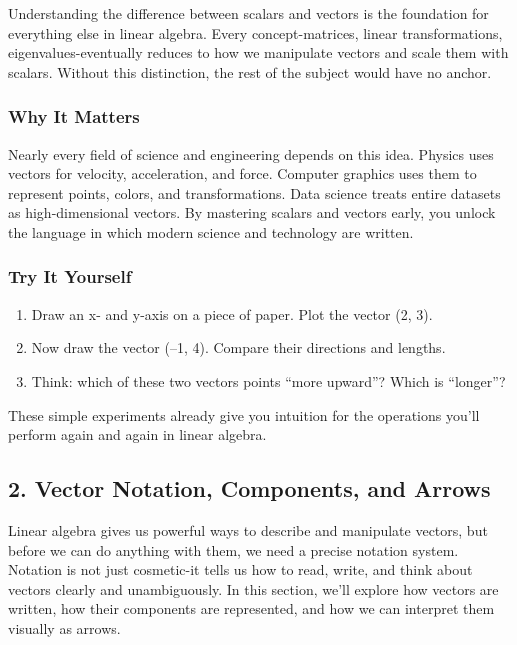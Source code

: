 \documentclass[
  letterpaper,
  DIV=11,
  numbers=noendperiod]{scrreprt}
\providecommand{\tightlist}{%
  \setlength{\itemsep}{0pt}\setlength{\parskip}{0pt}}
\begin{document}
Understanding the difference between scalars and vectors is the
foundation for everything else in linear algebra. Every
concept-matrices, linear transformations, eigenvalues-eventually reduces
to how we manipulate vectors and scale them with scalars. Without this
distinction, the rest of the subject would have no anchor.

\subsubsection{Why It Matters}\label{why-it-matters}

Nearly every field of science and engineering depends on this idea.
Physics uses vectors for velocity, acceleration, and force. Computer
graphics uses them to represent points, colors, and transformations.
Data science treats entire datasets as high-dimensional vectors. By
mastering scalars and vectors early, you unlock the language in which
modern science and technology are written.

\subsubsection{Try It Yourself}\label{try-it-yourself}

\begin{enumerate}
\def\labelenumi{\arabic{enumi}.}
\tightlist
\item
  Draw an x- and y-axis on a piece of paper. Plot the vector (2, 3).
\item
  Now draw the vector (--1, 4). Compare their directions and lengths.
\item
  Think: which of these two vectors points ``more upward''? Which is
  ``longer''?
\end{enumerate}

These simple experiments already give you intuition for the operations
you'll perform again and again in linear algebra.

\subsection{2. Vector Notation, Components, and
Arrows}\label{vector-notation-components-and-arrows}

Linear algebra gives us powerful ways to describe and manipulate
vectors, but before we can do anything with them, we need a precise
notation system. Notation is not just cosmetic-it tells us how to read,
write, and think about vectors clearly and unambiguously. In this
section, we'll explore how vectors are written, how their components are
represented, and how we can interpret them visually as arrows.
\end{document}

